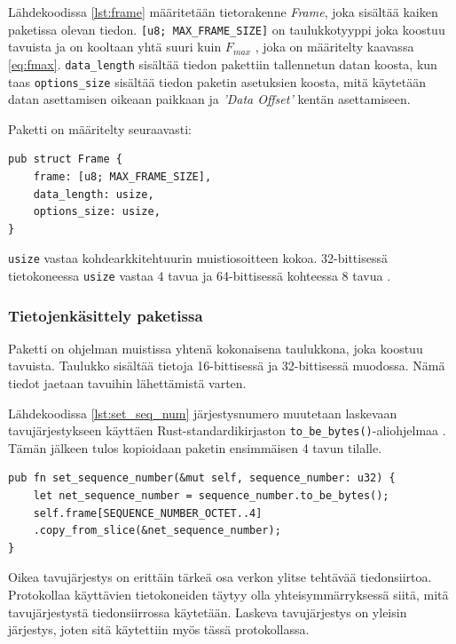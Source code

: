 \documentclass[a4paper,12pt]{article}
\begin{document}
    Lähdekoodissa \ref{lst:frame} määritetään tietorakenne \textit{Frame}, joka sisältää kaiken paketissa olevan tiedon.
    \lstinline{[u8; MAX_FRAME_SIZE]} on taulukkotyyppi joka koostuu tavuista ja on kooltaan yhtä suuri kuin $F_{max}$ , joka on määritelty kaavassa \ref{eq:fmax}.
    \lstinline{data_length} sisältää tiedon pakettiin tallennetun datan koosta, kun taas \lstinline{options_size} sisältää tiedon paketin asetuksien koosta, mitä käytetään datan asettamisen oikeaan paikkaan ja \textit{'Data Offset'} kentän asettamiseen.
    
    Paketti on määritelty seuraavasti:
    \begin{lstlisting}[caption={Paketin rakenne}, label={lst:frame}]
pub struct Frame {
    frame: [u8; MAX_FRAME_SIZE],
    data_length: usize,
    options_size: usize,
}\end{lstlisting}
    
    \lstinline{usize} vastaa kohdearkkitehtuurin muistiosoitteen kokoa. 32-bittisessä tietokoneessa \lstinline{usize} vastaa 4 tavua ja 64-bittisessä kohteessa 8 tavua \cite[\textit{usize}]{rust-std}.
   
    \subsubsection*{Tietojenkäsittely paketissa}
    Paketti on ohjelman muistissa yhtenä kokonaisena taulukkona, joka koostuu tavuista.
    Taulukko sisältää tietoja 16-bittisessä ja 32-bittisessä muodossa. Nämä tiedot jaetaan tavuihin lähettämistä varten.

    Lähdekoodissa \ref{lst:set_seq_num} järjestysnumero muutetaan laskevaan tavujärjestykseen käyttäen Rust-standardikirjaston \lstinline{to_be_bytes()}-aliohjelmaa \cite[\textit{u32}]{rust-std}. Tämän jälkeen tulos kopioidaan paketin ensimmäisen 4 tavun tilalle. \par
    
        \begin{lstlisting}[caption={Järjestysnumeron asettaminen pakettiin}, label={lst:set_seq_num}]
pub fn set_sequence_number(&mut self, sequence_number: u32) {
    let net_sequence_number = sequence_number.to_be_bytes();
    self.frame[SEQUENCE_NUMBER_OCTET..4]
    .copy_from_slice(&net_sequence_number);
}\end{lstlisting}


    Oikea tavujärjestys on erittäin tärkeä osa verkon ylitse tehtävää tiedonsiirtoa. Protokollaa käyttävien tietokoneiden täytyy olla yhteisymmärryksessä siitä, mitä tavujärjestystä tiedonsiirrossa käytetään. Laskeva tavujärjestys on yleisin järjestys, joten sitä käytettiin myös tässä protokollassa. \par
    
\end{document}
